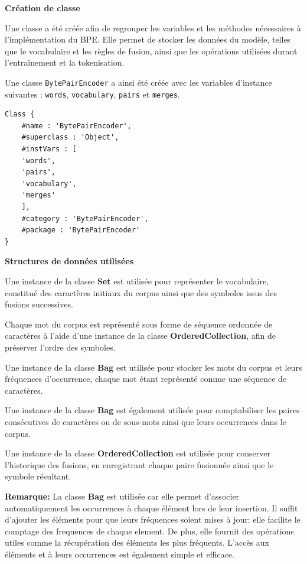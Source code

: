 \documentclass[12pt,a4paper]{report}
\begin{document}
\textbf{Création de classe}

Une classe a été créée afin de regrouper les variables et les méthodes nécessaires à l’implémentation du BPE. Elle permet de stocker les données du modèle, telles que le vocabulaire et les règles de fusion, ainsi que les opérations utilisées durant l’entraînement et la tokenisation.

Une classe \texttt{BytePairEncoder} a ainsi été créée avec les variables d’instance suivantes : \texttt{words}, \texttt{vocabulary}, \texttt{pairs} et \texttt{merges}. 

\begin{verbatim}
Class {
	#name : 'BytePairEncoder',
	#superclass : 'Object',
	#instVars : [
	'words',
	'pairs',
	'vocabulary',
	'merges'
	],
	#category : 'BytePairEncoder',
	#package : 'BytePairEncoder'
}
\end{verbatim}

\textbf{Structures de données utilisées}

\begin{itemizeFB}
	\item Une instance de la classe \textbf{Set} est utilisée pour représenter le vocabulaire, constitué des caractères initiaux du corpus ainsi que des symboles issus des fusions successives.
	\item Chaque mot du corpus est représenté sous forme de séquence ordonnée de caractères à l’aide d’une instance de la classe \textbf{OrderedCollection}, afin de préserver l’ordre des symboles.
	\item Une instance de la classe \textbf{ Bag} est utilisée pour stocker les mots du corpus et leurs fréquences d’occurrence, chaque mot étant représenté comme une séquence de caractères.
	\item Une instance de la classe \textbf{ Bag} est également utilisée pour comptabiliser les paires consécutives de caractères ou de sous-mots ainsi que leurs occurrences dans le corpus.
	\item Une instance de la classe \textbf{OrderedCollection} est utilisée pour conserver l’historique des fusions, en enregistrant chaque paire fusionnée ainsi que le symbole résultant.
\end{itemizeFB}

\textbf{Remarque:} La classe \textbf{ Bag} est utilisée car elle permet d’associer automatiquement les occurrences à chaque élément lors de leur insertion. Il suffit d’ajouter les éléments pour que leurs fréquences soient mises à jour: elle facilite le comptage des frequences de chaque element. De plus, elle fournit des opérations utiles comme la récupération des éléments les plus fréquents. L’accès aux éléments et à leurs occurrences est également simple et efficace.
\end{document}
